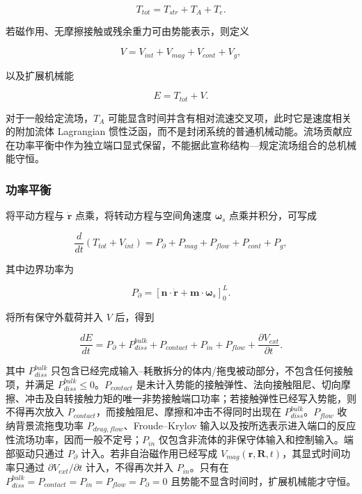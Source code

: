 \begin{equation}
\label{eq:rod-1-100}
T_{tot} = T_{str} + T_{A} + T_{e}.
\end{equation}

若磁作用、无摩擦接触或残余重力可由势能表示，则定义

\begin{equation}
\label{eq:rod-1-101}
V = V_{int} + V_{mag} + V_{cont} + V_{g},
\end{equation}

以及扩展机械能

\begin{equation}
\label{eq:rod-1-102}
\boxed{E = T_{tot} + V.}
\end{equation}

对于一般给定流场，\(T_{A}\) 可能显含时间并含有相对流速交叉项，此时它是速度相关的附加流体 Lagrangian 惯性泛函，而不是封闭系统的普通机械动能。流场贡献应在功率平衡中作为独立端口显式保留，不能据此宣称结构---规定流场组合的总机械能守恒。

\subsubsection{功率平衡}\label{sec:rod-1-7-2}

将平动方程与 \(\dot{\mathbf{r}}\) 点乘，将转动方程与空间角速度 \(\bm{\omega}_{s}\) 点乘并积分，可写成

\begin{equation}
\label{eq:rod-1-103}
\frac{d}{dt}\left( T_{tot} + V_{int} \right) = P_{\partial} + P_{mag} + P_{flow} + P_{cont} + P_{g},
\end{equation}

其中边界功率为

\begin{equation}
\label{eq:rod-1-104}
P_{\partial} = \left\lbrack \mathbf{n} \cdot \dot{\mathbf{r}} + \mathbf{m} \cdot \bm{\omega}_{s} \right\rbrack_{0}^{L}.
\end{equation}

将所有保守外载荷并入 \(V\) 后，得到

\begin{equation}
\label{eq:rod-1-105}
\boxed{\frac{dE}{dt} = P_{\partial} + P_{diss}^{bulk} + P_{contact} + P_{in} + P_{flow} + \frac{\partial V_{ext}}{\partial t}.}
\end{equation}

其中 \(P_{diss}^{bulk}\) 只包含已经完成输入--耗散拆分的体内/拖曳被动部分，不包含任何接触项，并满足 \(P_{diss}^{bulk} \leq 0\)。\(P_{contact}\) 是未计入势能的接触弹性、法向接触阻尼、切向摩擦、冲击及自转接触力矩的唯一非势接触端口功率；若接触弹性已经写入势能，则不得再次放入 \(P_{contact}\)，而接触阻尼、摩擦和冲击不得同时出现在 \(P_{diss}^{bulk}\)。\(P_{flow}\) 收纳背景流拖曳功率 \(P_{drag,flow}\)、Froude--Krylov 输入以及按所选表示进入端口的反应性流场功率，因而一般不定号；\(P_{in}\) 仅包含非流体的非保守体输入和控制输入。端部驱动只通过 \(P_{\partial}\) 计入。若非自治磁作用已经写成 \(V_{mag}\left( \mathbf{r},\mathbf{R},t \right)\)，其显式时间功率只通过 \(\partial V_{ext}/\partial t\) 计入，不得再次并入 \(P_{in}\)。只有在 \(P_{diss}^{bulk}=P_{contact}=P_{in}=P_{flow}=P_{\partial}=0\) 且势能不显含时间时，扩展机械能才守恒。

